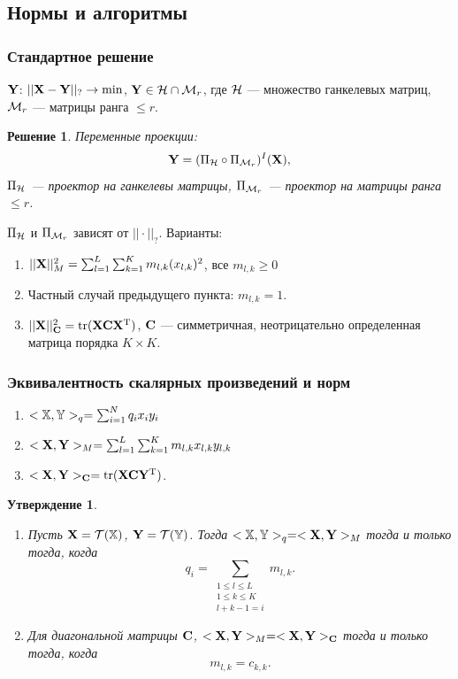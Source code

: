 \documentclass[unicode, notheorems]{beamer}
\newtheorem{proposition}{Утверждение}
\newtheorem{solution}{Решение}
\begin{document}
\subsection{Нормы и алгоритмы}
\begin{frame}
	\frametitle{Стандартное решение}
	$\mathbf{Y}$: $||\mathbf{X} - \mathbf{Y}||_? \to \min$, $\mathbf{Y} \in \mathcal{H} \cap \mathcal{M}_r$, где $\mathcal{H}$ --- множество ганкелевых матриц, $\mathcal{M}_r$ --- матрицы ранга $\le r$.
	
	\begin{solution}
		
		Переменные проекции: 
		\begin{equation*}
		\mathbf{Y} = (\Pi_{\mathcal{H}} \circ \Pi_{\mathcal{M}_r})^I (\mathbf{X}),
		\end{equation*}
		$\Pi_{\mathcal{H}}$ --- проектор на ганкелевы матрицы, $\Pi_{\mathcal{M}_r}$ --- проектор на матрицы ранга $\le r$.
	\end{solution}
	
	$\Pi_{\mathcal{H}}$ и $\Pi_{\mathcal{M}_r}$ зависят от $||\cdot||_?$. Варианты:
	\begin{enumerate}
		\item $||\mathbf{X}||_M^2 = \sum_{l = 1}^L \sum_{k = 1}^K m_{l, k} (x_{l, k})^2$, все $m_{l, k} \ge 0$
		\item Частный случай предыдущего пункта: $m_{l, k} = 1$.
		\item $||\mathbf{X}||_{\mathbf{C}}^2 = \text{tr}(\mathbf{X} \mathbf{C} \mathbf{X}^{\mathrm{T}})$, $\mathbf{C}$ --- симметричная, неотрицательно определенная матрица порядка $K \times K$.
	\end{enumerate}
\end{frame}

\begin{frame}
	\frametitle{Эквивалентность скалярных произведений и норм}
	\begin{enumerate}
		\item $<\mathbb{X}, \mathbb{Y}>_q = \sum_{i=1}^N q_i x_i  y_i$
		\item $<\mathbf{X}, \mathbf{Y}>_M = \sum_{l = 1}^L \sum_{k = 1}^K m_{l, k} x_{l, k} y_{l, k}$
		\item $<\mathbf{X}, \mathbf{Y}>_{\mathbf{C}} = \text{tr}(\mathbf{X} \mathbf{C} \mathbf{Y}^{\mathrm{T}})$.
	\end{enumerate}
	\begin{proposition}
		\small
	    \begin{enumerate}
		\item Пусть $\mathbf{X} = \mathcal{T}(\mathbb{X})$,  $\mathbf{Y} = \mathcal{T}(\mathbb{Y})$. Тогда $<\mathbb{X},\mathbb{Y}>_q= <\mathbf{X},\mathbf{Y}>_M$ тогда и только тогда, когда
		\begin{equation*}
		q_i = \sum_{\substack{1 \le l \le L \\ 1 \le k \le K \\ l+k-1=i}} m_{l,k}.
		\end{equation*}
		
		\item Для диагональной матрицы $\mathbf{C}$, $<\mathbf{X},\mathbf{Y}>_M= <\mathbf{X},\mathbf{Y}>_{\mathbf{C}}$ тогда и только тогда, когда
		\begin{equation*}
		m_{l,k}=c_{k,k}.
		\end{equation*}
	    \end{enumerate}
	\end{proposition}
	
\end{frame}
\end{document}
